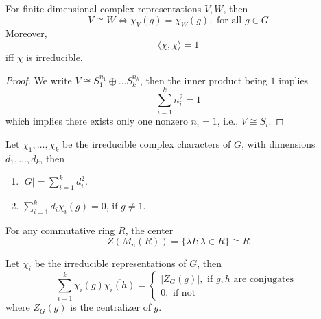 \documentclass[openany]{book}
\newcommand{\la}{\langle}
\newcommand{\ra}{\rangle}
\begin{document}
\begin{prop}
    For finite dimensional complex representations $V,W$, then 
    \begin{equation*}
        V\cong W\iff \chi_V(g)=\chi_W(g), \text{ for all } g\in G
    \end{equation*}
    Moreover, 
    \begin{equation*}
        \la \chi,\chi\ra=1
    \end{equation*}
    iff $\chi$ is irreducible.
\end{prop}
\begin{proof}
    We write $V\cong S_1^{n_1}\oplus\dots S_k^{n_k}$, then the inner product being $1$ implies 
    \begin{equation*}
        \sum_{i=1}^kn_i^2=1
    \end{equation*}
    which implies there exists only one nonzero $n_i=1$, i.e., $V\cong S_i$.
\end{proof}

\begin{prop}[orthogonality]
    Let $\chi_1,\dots,\chi_k$ be the irreducible complex characters of $G$, with dimensions $d_1,\dots, d_k$, then 
    \begin{enumerate}
        \item $|G|=\sum_{i=1}^kd_i^2$.
        \item $\sum_{i=1}^kd_i\chi_i(g)=0$, if $g\neq 1$.
    \end{enumerate} 
\end{prop}


\begin{prop}
    For any commutative ring $R$, the center 
    \begin{equation*}
        Z(M_n(R))=\{\lambda I: \lambda\in R\}\cong R
    \end{equation*}
\end{prop}


\begin{prop}
    Let $\chi_i$ be the irreducible representations of $G$, then 
    \begin{equation*}
        \sum_{i=1}^k\chi_i(g)\overline{\chi_i(h)}=\begin{cases}
            |Z_G(g)|, \text{ if $g,h$ are conjugates } \\
            0, \text{ if not}
        \end{cases}
    \end{equation*}
    where $Z_G(g)$ is the centralizer of $g$.
\end{prop}
\end{document}
